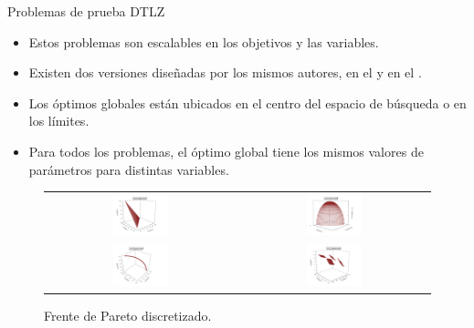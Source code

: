 \documentclass{beamer}
\begin{document}
\begin{frame}{Problemas de prueba DTLZ}
\begin{itemize}
   \scriptsize
   \item Estos problemas son escalables en los objetivos y las variables.
   \item Existen dos versiones diseñadas por los mismos autores, en el \citeyear{Joel:DTLZ_1} y en el \citeyear{Joel:DTLZ_2}.
   \item Los óptimos globales están ubicados en el centro del espacio de búsqueda o en los límites.
   \item Para todos los problemas, el óptimo global tiene los mismos valores de parámetros para distintas variables.
\end{itemize}
\begin{figure}[H]
\begin{tabular}{c c}
\includegraphics[width=0.3\textwidth]{Images/DTLZ1.jpg}     &  \includegraphics[width=0.3\textwidth]{Images/DTLZ3.jpg} \\
\includegraphics[width=0.3\textwidth]{Images/DTLZ5.jpg}     &  \includegraphics[width=0.3\textwidth]{Images/DTLZ7.jpg} \\
\end{tabular}
\centering
\caption{\scriptsize Frente de Pareto discretizado.}
\end{figure}

\end{frame}
\end{document}
